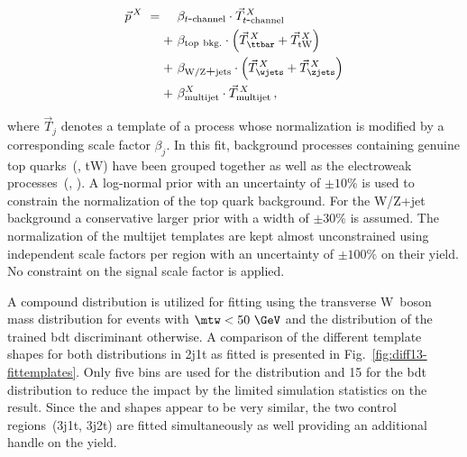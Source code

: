 \begin{subequations}
\begin{align}
\vec{p}^{\,X}~=\hphantom{+}&~\beta_{t\mathrm{\mbox{-}channel}}\cdot \vec{T}_{t\mathrm{\mbox{-}channel}}^{\,X}\\
+&~\beta_\mathrm{top~bkg.}\cdot\Big(\vec{T}^{\,X}_{\ttbar}+\vec{T}^{\,X}_\mathrm{tW}\Big)\\
+&~\beta_\mathrm{W/Z\mbox{+}jets}\cdot\Big(\vec{T}^{\,X}_{\wjets}+\vec{T}^{\,X}_{\zjets}\Big)\\
+&~\beta_\mathrm{multijet}^{X}\cdot \vec{T}^{\,X}_\mathrm{multijet}\,,
\end{align}
\end{subequations}

where $\vec{T}_{j}$ denotes a template of a process whose normalization is modified by a corresponding scale factor $\beta_{j}$. In this fit, background processes containing genuine top quarks~(\ttbar, tW) have been grouped together as well as the electroweak processes~(\wjets, \zjets). A log-normal prior with an uncertainty of $\pm10\%$ is used to constrain the normalization of the top quark background. For the W/Z+jet background a conservative larger prior with a width of $\pm30\%$ is assumed. The normalization of the multijet templates are kept almost unconstrained using independent scale factors per region with an uncertainty of $\pm100\%$ on their yield. No constraint on the signal scale factor is applied.

A compound distribution is utilized for fitting using the transverse W~boson mass distribution for events with $\mtw<50~\GeV$ and the distribution of the trained \gls{bdt} discriminant otherwise. A comparison of the different template shapes for both distributions in 2j1t as fitted is presented in Fig.~\ref{fig:diff13-fittemplates}. Only five bins are used for the \mtw distribution and 15 for the \gls{bdt} distribution to reduce the impact by the limited simulation statistics on the result. Since the \ttbar and \wjets shapes appear to be very similar, the two \ttbar control regions~(3j1t, 3j2t) are fitted simultaneously as well providing an additional handle on the \ttbar yield. 


